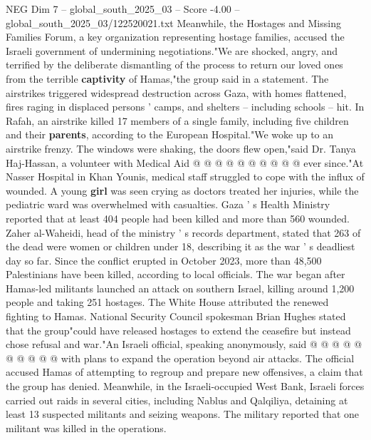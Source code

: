 \begin{textsample}{NEG Dim 7 – global\_south\_2025\_03 – Score -4.00 – global\_south\_2025\_03/122520021.txt}
Meanwhile, the Hostages and Missing Families Forum, a key organization representing hostage families, accused the Israeli government of undermining negotiations."We are shocked, angry, and terrified by the deliberate dismantling of the process to return our loved ones from the terrible \textbf{captivity} of Hamas,"the group said in a statement.
The airstrikes triggered widespread destruction across Gaza, with homes flattened, fires raging in displaced persons ' camps, and shelters -- including schools -- hit.
In Rafah, an airstrike killed 17 members of a single family, including five children and their \textbf{parents}, according to the European Hospital."We woke up to an airstrike frenzy.
The windows were shaking, the doors flew open,"said Dr.
Tanya Haj-Hassan, a volunteer with Medical Aid @ @ @ @ @ @ @ @ @ @ ever since."At Nasser Hospital in Khan Younis, medical staff struggled to cope with the influx of wounded.
A young \textbf{girl} was seen crying as doctors treated her injuries, while the pediatric ward was overwhelmed with casualties.
Gaza ' s Health Ministry reported that at least 404 people had been killed and more than 560 wounded.
Zaher al-Waheidi, head of the ministry ' s records department, stated that 263 of the dead were women or children under 18, describing it as the war ' s deadliest day so far.
Since the conflict erupted in October 2023, more than 48,500 Palestinians have been killed, according to local officials.
The war began after Hamas-led militants launched an attack on southern Israel, killing around 1,200 people and taking 251 hostages.
The White House attributed the renewed fighting to Hamas.
National Security Council spokesman Brian Hughes stated that the group"could have released hostages to extend the ceasefire but instead chose refusal and war."An Israeli official, speaking anonymously, said @ @ @ @ @ @ @ @ @ @ with plans to expand the operation beyond air attacks.
The official accused Hamas of attempting to regroup and prepare new offensives, a claim that the group has denied.
Meanwhile, in the Israeli-occupied West Bank, Israeli forces carried out raids in several cities, including Nablus and Qalqiliya, detaining at least 13 suspected militants and seizing weapons.
The military reported that one militant was killed in the operations.

\end{textsample}
